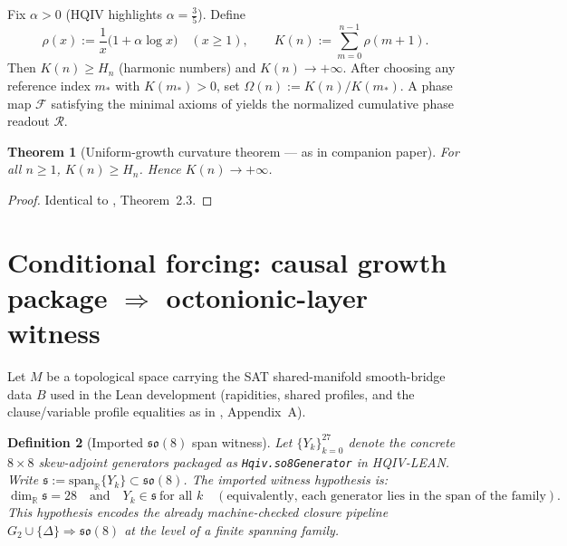 \documentclass[11pt]{amsart}
\newtheorem{theorem}{Theorem}[section]
\newtheorem{definition}[theorem]{Definition}
\begin{document}
Fix \(\alpha>0\) (HQIV highlights \(\alpha=\tfrac35\)). Define
\[
\rho(x):=\frac{1}{x}\bigl(1+\alpha\log x\bigr)\quad (x\ge 1),\qquad
K(n):=\sum_{m=0}^{n-1}\rho(m+1).
\]
Then \(K(n)\ge H_n\) (harmonic numbers) and \(K(n)\to+\infty\). After choosing any reference index \(m_\ast\) with \(K(m_\ast)>0\), set \(\Omega(n):=K(n)/K(m_\ast)\). A phase map \(\mathcal{F}\) satisfying the minimal axioms of \cite{hqiv-so8-paper} yields the normalized cumulative phase readout \(\mathcal{R}\).

\begin{theorem}[Uniform-growth curvature theorem --- as in companion paper]
For all \(n\ge 1\), \(K(n)\ge H_n\). Hence \(K(n)\to+\infty\).
\end{theorem}

\begin{proof}
Identical to \cite{hqiv-so8-paper}, Theorem~2.3.
\end{proof}

\section{Conditional forcing: causal growth package \texorpdfstring{$\Rightarrow$}{=>} octonionic-layer witness}
\label{sec:conditional-forcing}

Let \(M\) be a topological space carrying the SAT shared-manifold smooth-bridge data \(B\) used in the Lean development (rapidities, shared profiles, and the clause/variable profile equalities as in \cite{hqiv-so8-paper}, Appendix~A).

\begin{definition}[Imported \(\mathfrak{so}(8)\) span witness]
Let \(\{Y_k\}_{k=0}^{27}\) denote the concrete \(8\times 8\) skew-adjoint generators packaged as \texttt{Hqiv.so8Generator} in HQIV-LEAN. Write \(\mathfrak{s}:=\mathrm{span}_{\mathbb{R}}\{Y_k\}\subset \mathfrak{so}(8)\). The \emph{imported witness hypothesis} is:
\[
\dim_{\mathbb{R}}\mathfrak{s}=28
\quad\text{and}\quad
Y_k\in \mathfrak{s}\ \text{for all }k
\quad(\text{equivalently, each generator lies in the span of the family}).
\]
This hypothesis encodes the already machine-checked closure pipeline \(G_2\cup\{\Delta\}\Rightarrow\mathfrak{so}(8)\) at the level of a finite spanning family.
\end{definition}
\end{document}
